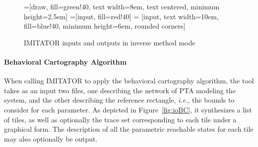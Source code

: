 \documentclass[a4paper,11pt]{report}
\makeatletter
\newcommand{\A}{\mathcal{A}}
\newcommand{\imitator}{\textsf{IMITATOR}}
\newcommand{\ie}{\textcolor{colorok}{\textit{i.e.},\@}}
\makeatother
\begin{document}
\begin{figure}[ht!]
=[draw, fill=green!40, text width=8em,
    text centered, minimum height=2.5em]
=[input, fill=red!40]
 = [input, text width=10em, fill=blue!40,
    minimum height=6em, rounded corners]
\def\blockdist{2.3}
\def\edgedist{2.5}

{

\centering


}

\caption{\imitator{} inputs and outputs in inverse method mode}
\label{fig:ioIM}
\end{figure}


\paragraph{Behavioral Cartography Algorithm}
When calling \imitator{} to apply the behavioral cartography algorithm, the tool takes as an input two files, one describing the network of PTA modeling the system, and the other describing the reference rectangle, \ie{} the bounds to consider for each parameter.
As depicted in Figure~\ref{fig:ioBC}, it synthesizes a list of tiles, as well as optionally the trace set corresponding to each tile under a graphical form.
The description of all the parametric reachable states for each tile may also optionally be output.
\end{document}
